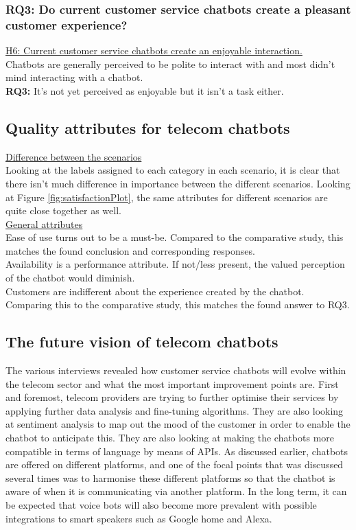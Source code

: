 \subsubsection{RQ3: Do current customer service chatbots create a pleasant customer experience?}
\ul{H6: Current customer service chatbots create an enjoyable interaction.}\\
Chatbots are generally perceived to be polite to interact with and most didn't mind interacting with a chatbot.\\
\break
\textbf{RQ3:} It's not yet perceived as enjoyable but it isn't a task either.\\

\subsection{Quality attributes for telecom chatbots}
\ul{Difference between the scenarios}\\
Looking at the labels assigned to each category in each scenario, it is clear that there isn't much difference in importance between the different scenarios. Looking at Figure \ref{fig:satisfactionPlot}, the same attributes for different scenarios are quite close together as well.\\
\break
\ul{General attributes}\\
Ease of use turns out to be a must-be. Compared to the comparative study, this matches the found conclusion and corresponding responses.\\
Availability is a performance attribute. If not/less present, the valued perception of the chatbot would diminish.\\
Customers are indifferent about the experience created by the chatbot. Comparing this to the comparative study, this matches the found answer to RQ3.

\subsection{The future vision of telecom chatbots}
The various interviews revealed how customer service chatbots will evolve within the telecom sector and what the most important improvement points are. First and foremost, telecom providers are trying to further optimise their services by applying further data analysis and fine-tuning algorithms. They are also looking at sentiment analysis to map out the mood of the customer in order to enable the chatbot to anticipate this. They are also looking at making the chatbots more compatible in terms of language by means of APIs. As discussed earlier, chatbots are offered on different platforms, and one of the focal points that was discussed several times was to harmonise these different platforms so that the chatbot is aware of when it is communicating via another platform. In the long term, it can be expected that voice bots will also become more prevalent with possible integrations to smart speakers such as Google home and Alexa.


